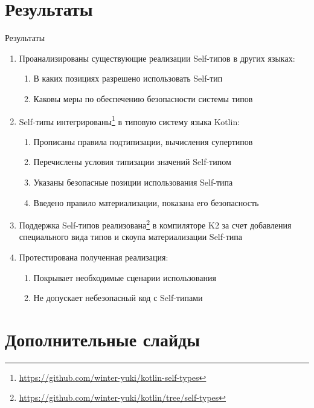 \documentclass[handout,aspectratio=169,usenames,dvipsnames]{beamer}
\begin{document}
    \section{Результаты}

    \begin{frame}{Результаты}
        \begin{enumerate}
            \item Проанализированы существующие реализации Self-типов в других языках:
            \begin{enumerate}
                \item В каких позициях разрешено использовать Self-тип
                \item Каковы меры по обеспечению безопасности системы типов
            \end{enumerate} \pause
            \item Self-типы интегрированы\footnote{\url{https://github.com/winter-yuki/kotlin-self-types}} в типовую систему языка Kotlin:
            \begin{enumerate}
                \item Прописаны правила подтипизации, вычисления супертипов
                \item Перечислены условия типизации значений Self-типом
                \item Указаны безопасные позиции использования Self-типа
                \item Введено правило материализации, показана его безопасность
            \end{enumerate} \pause
            \item Поддержка Self-типов реализована\footnote{\url{https://github.com/winter-yuki/kotlin/tree/self-types}} в компиляторе K2 за счет добавления специального вида типов и скоупа материализации Self-типа \pause
            \item Протестирована полученная реализация:
            \begin{enumerate}
                \item Покрывает необходимые сценарии использования
                \item Не допускает небезопасный код с Self-типами
            \end{enumerate}
        \end{enumerate}
    \end{frame}


    \appendix


    \section{Дополнительные слайды}
\end{document}
